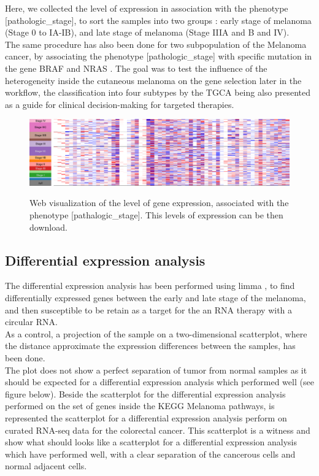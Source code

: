 \documentclass[a4paper,12pt]{report}
\begin{document}
Here, we collected the level of expression in association with the phenotype [pathologic\_stage], to sort the samples into two groups : early stage of melanoma (Stage 0 to IA-IB), and late stage of melanoma (Stage IIIA and B and IV)\cite{joint}. \\

The same procedure has also been done for two subpopulation of the Melanoma cancer\cite{TGCA}, by associating the phenotype [pathologic\_stage] with specific mutation in the gene BRAF and NRAS \cite{TGCA}. The goal was to test the influence of the heterogeneity inside the cutaneous melanoma on the gene selection later in the workflow, the classification into four subtypes by the TGCA being also presented as a guide for clinical decision-making for targeted therapies\cite{TGCA}.\\

\begin{figure}[H]
	\centering
	{\includegraphics[width=1\textwidth]{Xena_melanoma.pdf}}
	\caption{Web visualization of the level of gene expression, associated with the phenotype [pathalogic\_stage]. This levels of expression can be then download.}
\end{figure}


\subsection{Differential expression analysis}

The differential expression analysis has been performed using limma \cite{limma}, to find differentially expressed genes between the early and late stage of the melanoma, and then susceptible to be retain as a target for the an RNA therapy with a circular RNA.\\

As a control, a projection of the sample on a two-dimensional scatterplot, where the distance approximate the expression differences between the samples, has been done.\\

The plot does not show a perfect separation of tumor from normal samples as it should be expected for a differential expression analysis which performed well (see figure below). Beside the scatterplot for the differential expression analysis performed on the set of genes inside the KEGG Melanoma pathways, is represented the scatterplot for a differential expression analysis perform on curated RNA-seq data for the colorectal cancer\cite{curated}. This scatterplot is a witness and show what should looks like a scatterplot for a differential expression analysis which have performed well, with a clear separation of the cancerous cells and normal adjacent cells.\\
\end{document}
